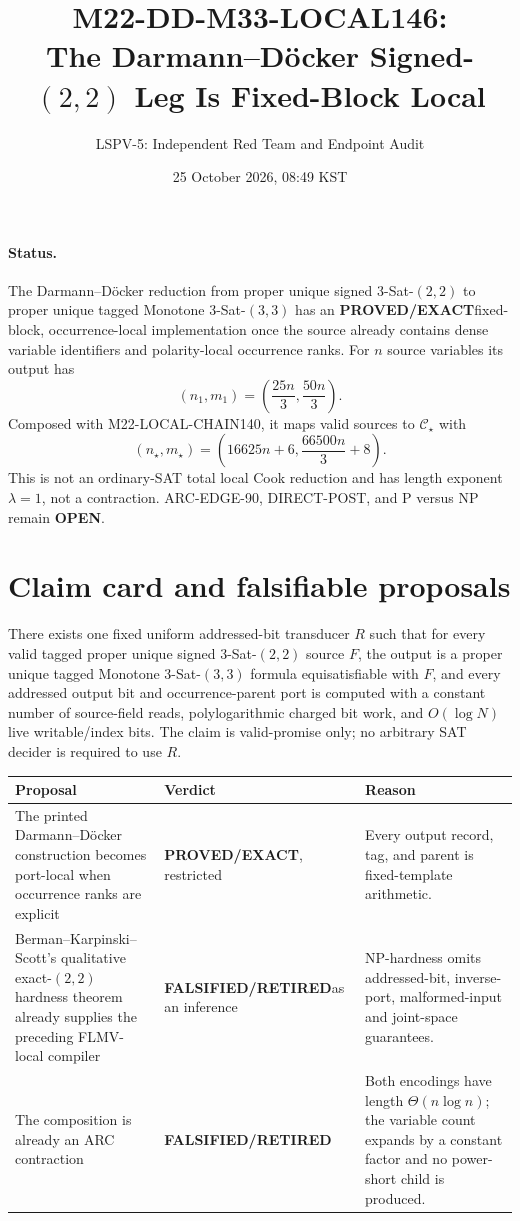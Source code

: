\documentclass[11pt]{article}
\title{M22-DD-M33-LOCAL146:\\The Darmann--D\"ocker Signed-$(2,2)$ Leg Is Fixed-Block Local}
\author{LSPV-5: Independent Red Team and Endpoint Audit}
\date{25 October 2026, 08:49 KST}
\newcommand{\EXACT}{\textbf{PROVED/EXACT}}
\newcommand{\OPEN}{\textbf{OPEN}}
\newcommand{\RETIRED}{\textbf{FALSIFIED/RETIRED}}
\begin{document}
\maketitle

\paragraph{Status.}
The Darmann--D\"ocker reduction from proper unique signed
3-Sat-$(2,2)$ to proper unique tagged Monotone 3-Sat-$(3,3)$ has an
\EXACT fixed-block, occurrence-local implementation once the source already
contains dense variable identifiers and polarity-local occurrence ranks.
For \(n\) source variables its output has
\[
(n_1,m_1)=\left(\frac{25n}{3},\frac{50n}{3}\right).
\]
Composed with M22-LOCAL-CHAIN140, it maps valid sources to
\(\mathcal C_\star\) with
\[
(n_\star,m_\star)=\left(16625n+6,\frac{66500n}{3}+8\right).
\]
This is not an ordinary-SAT total local Cook reduction and has length
exponent \(\lambda=1\), not a contraction.  ARC-EDGE-90, DIRECT-POST, and
P versus NP remain \OPEN.

\section{Claim card and falsifiable proposals}
There exists one fixed uniform addressed-bit transducer \(R\) such that for
every valid tagged proper unique signed 3-Sat-$(2,2)$ source \(F\), the output
is a proper unique tagged Monotone 3-Sat-$(3,3)$ formula equisatisfiable with
\(F\), and every addressed output bit and occurrence-parent port is computed
with a constant number of source-field reads, polylogarithmic charged bit
work, and \(O(\log N)\) live writable/index bits.  The claim is valid-promise
only; no arbitrary SAT decider is required to use \(R\).

\begin{center}\small
\begin{tabular}{@{}p{.43\linewidth}p{.18\linewidth}p{.32\linewidth}@{}}
\toprule
Proposal & Verdict & Reason\\ \midrule
The printed Darmann--D\"ocker construction becomes port-local when
occurrence ranks are explicit & \EXACT, restricted & Every output record,
tag, and parent is fixed-template arithmetic.\\
Berman--Karpinski--Scott's qualitative exact-$(2,2)$ hardness theorem already
supplies the preceding FLMV-local compiler & \RETIRED as an inference &
NP-hardness omits addressed-bit, inverse-port, malformed-input and joint-space
guarantees.\\
The composition is already an ARC contraction & \RETIRED &
Both encodings have length \(\Theta(n\log n)\); the variable count expands by
a constant factor and no power-short child is produced.\\
\bottomrule
\end{tabular}
\end{center}
\end{document}

